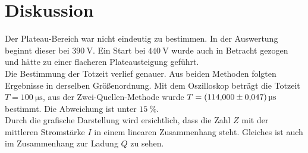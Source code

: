 \section{Diskussion}
\label{sec:Diskussion}
Der Plateau-Bereich war nicht eindeutig zu bestimmen.
In der Auswertung beginnt dieser bei $\SI{390}{\volt}$.
Ein Start bei $\SI{440}{\volt}$ wurde auch in Betracht gezogen und hätte zu einer flacheren Plateausteigung geführt.
\\
Die Bestimmung der Totzeit verlief genauer.
Aus beiden Methoden folgten Ergebnisse in derselben Größenordnung.
Mit dem Oszilloskop beträgt die Totzeit $T= \SI{100}{\micro\second}$, aus der Zwei-Quellen-Methode wurde $T= \SI{114 \pm 0.047}{\micro\second}$ bestimmt.
Die Abweichung ist unter $\SI{15}{\percent}$.
\\
Durch die grafische Darstellung wird ersichtlich, dass die Zahl $Z$ mit der mittleren Stromstärke $I$ in einem linearen Zusammenhang steht.
Gleiches ist auch im Zusammenhang zur Ladung $Q$ zu sehen.